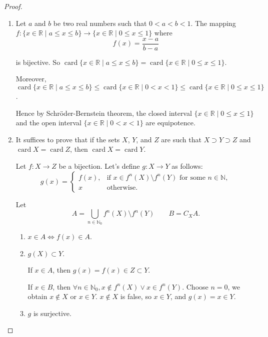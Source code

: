 \begin{proof}
    \begin{enumerate}[label={(\alph*)}]
        \item Let $a$ and $b$ be two real numbers such that $0 < a < b < 1$. The mapping $f: \{ x\in \mathbb{R} \mid a\leq x\leq b \} \to \{ x\in \mathbb{R} \mid 0\leq x\leq 1 \}$ where
              \[
                  f(x) = \frac{x - a}{b - a}
              \]

              is bijective. So $\operatorname{card} \{ x\in \mathbb{R} \mid a\leq x\leq b \} = \operatorname{card}\{ x\in \mathbb{R} \mid 0\leq x\leq 1 \}$.

              Moreover, $\operatorname{card} \{ x\in \mathbb{R} \mid a\leq x\leq b \} \leq \operatorname{card}\{ x\in \mathbb{R} \mid 0 < x < 1 \}\leq \operatorname{card}\{ x\in \mathbb{R} \mid 0 \leq x \leq 1 \}$.

              Hence by Schröder-Bernstein theorem, the closed interval $\{ x\in \mathbb{R} \mid 0\leq x\leq 1 \}$ and the open interval $\{ x\in \mathbb{R} \mid 0 < x < 1 \}$ are equipotence.
        \item It suffices to prove that if the sets $X$, $Y$, and $Z$ are such that $X \supset Y \supset Z$ and $\operatorname{card} X = \operatorname{card} Z$, then $\operatorname{card} X = \operatorname{card} Y$.

              Let $f : X \to Z$ be a bijection. Let's define  $g: X\to Y$ as follows:
              \[
                  g(x) = \begin{cases}
                      f(x), & \text{if $x\in f^{n}(X)\setminus f^{n}(Y)$ for some $n\in\mathbb{N}$}, \\
                      x     & \text{otherwise.}
                  \end{cases}
              \]

              Let
              \[
                  A = \bigcup_{n\in\mathbb{N}_{0}} f^{n}(X)\setminus f^{n}(Y) \qquad B = C_{X}A.
              \]

              \begin{enumerate}[label={(\roman*)}]
                  \item $x\in A\Leftrightarrow f(x)\in A$.
                  \item $g(X)\subset Y$.

                        If $x\in A$, then $g(x) = f(x)\in Z\subset Y$.

                        If $x\in B$, then $\forall n\in\mathbb{N}_{0}, x\notin f^{n}(X) \lor x\in f^{n}(Y)$. Choose $n = 0$, we obtain $x\notin X$ or $x\in Y$. $x\notin X$ is false, so $x\in Y$, and $g(x) = x\in Y$.
                  \item $g$ is surjective.


\end{enumerate}
\end{enumerate}
\end{proof}

